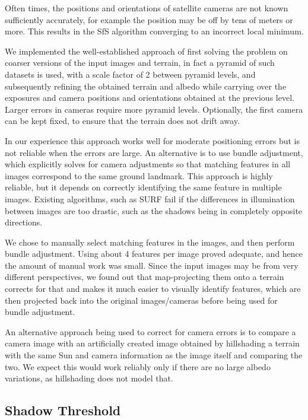 \documentclass[12pt,oneside]{article}
\begin{document}
Often times, the positions and orientations of satellite cameras
are not known sufficiently accurately, for example the position may be off by tens of meters or more.
This results in the SfS algorithm converging to an incorrect local minimum. 

We implemented the well-established approach of
first solving the problem on coarser versions of the input images and
terrain, in fact a pyramid of such datasets is used, with a scale factor
of 2 between pyramid levels, and subsequently refining the obtained
terrain and albedo while carrying over the exposures and camera
positions and orientations obtained at the previous level. Larger errors
in cameras require more pyramid levels. Optionally, the first camera can
be kept fixed, to ensure that the terrain does not drift away.

In our experience this approach works well for moderate positioning errors but is not 
reliable when the errors are large. An alternative is to use bundle adjustment,
which explicitly solves for camera adjustments so that matching features in
all images correspond to the same ground landmark. This approach is highly 
reliable, but it depends on correctly identifying the same feature in multiple images.
Existing algorithms, such as SURF fail if the differences in illumination between
images are too drastic, such as the shadows being in completely opposite directions.

We chose to manually select matching features in the images, and then perform
bundle adjustment. Using about 4 features per image proved adequate, and hence
the amount of manual work was small. Since the input images may be from very different
perspectives, we found out that map-projecting them onto a terrain corrects for that
and makes it much easier to visually identify features, which are then projected
back into the original images/cameras before being used for bundle adjustment.

An alternative approach being used to correct for camera errors is to compare a 
camera image with an artificially created image obtained by hillshading a terrain
with the same Sun and camera information as the image itself and comparing the two.
We expect this would work reliably only if there are no large albedo variations,
as hillshading does not model that. 

\subsection{Shadow Threshold}
\label{shadow}
\end{document}
